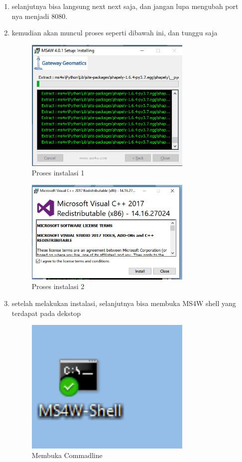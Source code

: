 \begin{enumerate}
	\item selanjutnya bisa langsung next next saja, dan jangan lupa mengubah port nya menjadi 8080.

	\item kemudian akan muncul proses seperti dibawah ini, dan tunggu saja
    \hfill\break
	\begin{figure}[H]
		\includegraphics[width=8cm]{figures/1174057/4Tugastiga.PNG}
		\centering
		\caption{Proses instalasi 1}
	\end{figure}

	\begin{figure}[H]
		\includegraphics[width=8cm]{figures/1174057/4Tugasempat.PNG}
		\centering
		\caption{Proses instalasi 2}
	\end{figure}

	\item setelah melakukan instalasi, selanjutnya bisa membuka MS4W shell yang terdapat pada dekstop
    \hfill\break
	\begin{figure}[H]
		\includegraphics[width=8cm]{figures/1174057/4Tugaslima.PNG}
		\centering
		\caption{Membuka Commadline}
	\end{figure}


\end{enumerate}
